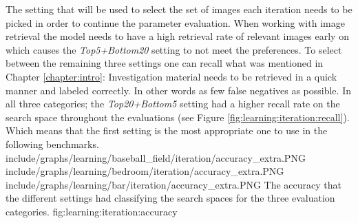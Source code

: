 The setting that will be used to select the set of images each iteration needs to be picked in order to continue the parameter evaluation. When working with image retrieval the model needs to have a high retrieval rate of relevant images early on which causes the \emph{Top5+Bottom20} setting to not meet the preferences. To select between the remaining three settings one can recall what was mentioned in Chapter \ref{chapter:intro}: Investigation material needs to be retrieved in a quick manner and labeled correctly. In other words as few false negatives as possible. In all three categories; the \emph{Top20+Bottom5} setting had a higher recall rate on the search space throughout the evaluations (see Figure \ref{fig:learning:iteration:recall}). Which means that the first setting is the most appropriate one to use in the following benchmarks. 
\tripfigure
{include/graphs/learning/baseball_field/iteration/accuracy_extra.PNG}
{include/graphs/learning/bedroom/iteration/accuracy_extra.PNG}
{include/graphs/learning/bar/iteration/accuracy_extra.PNG}
{The accuracy that the different settings had classifying the search spaces for the three evaluation categories.}
{fig:learning:iteration:accuracy}
